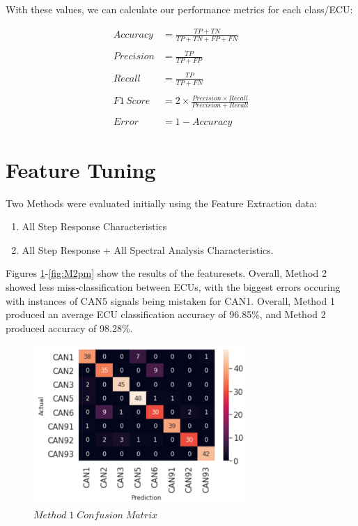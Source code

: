 \documentclass[conference]{IEEEtran}
\begin{document}
With these values, we can calculate our performance metrics for each class/ECU:

\begin{align*}
    Accuracy & = \frac{TP + TN}{TP + TN + FP + FN}\\\\
    Precision & = \frac{TP}{TP + FP}\\\\
    Recall & = \frac{TP}{TP + FN}\\\\
    F1\,Score & = 2 \times \frac{Precision \times Recall}{Precision + Recall}\\\\
    Error & = 1 - Accuracy
\end{align*}

\section{Feature Tuning}
Two Methods were evaluated initially using the Feature Extraction data:
\begin{enumerate}
    \item All Step Response Characteristics
    \item All Step Response + All Spectral Analysis Characteristics. 
\end{enumerate}
Figures \ref{fig:M1cm}-\ref{fig:M2pm} show the results of the featuresets. Overall, Method 2 showed less miss-classification between ECUs, with the biggest errors occuring with instances of CAN5 signals being mistaken for CAN1. Overall, Method 1 produced an average ECU classification accuracy of 96.85\%, and Method 2 produced accuracy of 98.28\%.

\begin{figure}[htb]
\centering
\includegraphics[width=3.2in]{figures/80_m1cm.png}
\caption{$Method\;1\;Confusion\;Matrix$}
\label{fig:M1cm}
\end{figure}
\end{document}
